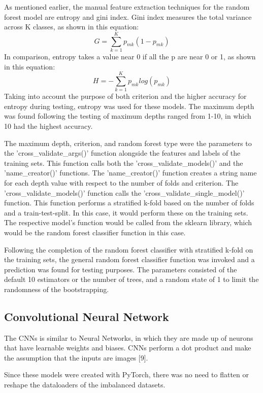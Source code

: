 \documentclass[conference]{IEEEtran}
\begin{document}
As mentioned earlier, the manual feature extraction techniques for the random forest model are entropy and gini index. Gini index measures the total variance across K classes, as shown in this equation: 
\begin{equation}
G = \sum_{k=1}^{K} p_{mk}(1 - p_{mk})\label{eq}
\end{equation}
In comparison, entropy takes a value near 0 if all the p are near 0 or 1, as shown in this equation: 
\begin{equation}
H = -\sum_{k=1}^{K} p_{mk}log(p_{mk})\label{eq}
\end{equation}
Taking into account the purpose of both criterion and the higher accuracy for entropy during testing, entropy was used for these models. The maximum depth was found following the testing of maximum depths ranged from 1-10, in which 10 had the highest accuracy. 

The maximum depth, criterion, and random forest type were the parameters to the 'cross\_validate\_args()' function alongside the features and labels of the training sets. This function calls both the 'cross\_validate\_models()' and the 'name\_creator()' functions. The 'name\_creator()' function creates a string name for each depth value with respect to the number of folds and criterion. The 'cross\_validate\_models()' function calls the 'cross\_validate\_single\_model()' function. This function performs a stratified k-fold based on the number of folds and a train-test-split. In this case, it would perform these on the training sets. The respective model's function would be called from the sklearn library, which would be the random forest classifier function in this case. 

Following the completion of the random forest classifier with stratified k-fold on the training sets, the general random forest classifier function was invoked and a prediction was found for testing purposes. The parameters consisted of the default 10 estimators or the number of trees, and a random state of 1 to limit the randomness of the bootstrapping. 

\subsection{Convolutional Neural Network}
The CNNs is similar to Neural Networks, in which they are made up of neurons that have learnable weights and biases. CNNs perform a dot product and make the assumption that the inputs are images [9]. 

Since these models were created with PyTorch, there was no need to flatten or reshape the dataloaders of the imbalanced datasets. 
\end{document}
